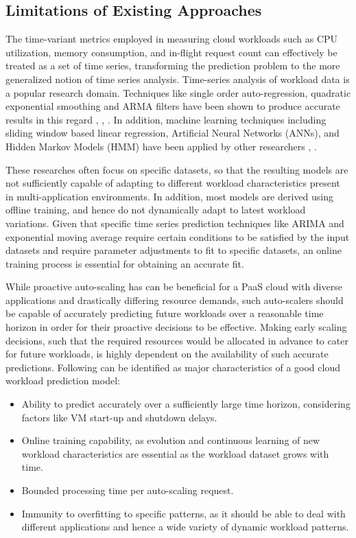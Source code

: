 \subsection{Limitations of Existing Approaches}

The time-variant metrics employed in measuring cloud workloads such as CPU utilization, memory consumption, and in-flight request count can effectively be treated as a set of time series, transforming the prediction problem to the more generalized notion of time series analysis. Time-series analysis of workload data is a popular research domain. Techniques like single order auto-regression, quadratic exponential smoothing and ARMA filters have been shown to produce accurate results in this regard \cite{Roy_2011}, \cite{Kupferman_2009}, \cite{Mi_2010}. In addition, machine learning techniques including sliding window based linear regression, Artificial Neural Networks (ANNs), and Hidden Markov Models (HMM) have been applied by other researchers \cite{Yang_2013}, \cite{Khan_2012}.

These researches often focus on specific datasets, so that the resulting models are not sufficiently capable of adapting to different workload characteristics present in multi-application environments. In addition, most models are derived using offline training, and hence do not dynamically adapt to latest workload variations. Given that specific time series prediction techniques like ARIMA and exponential moving average require certain conditions to be satisfied by the input datasets and require parameter adjustments to fit to specific datasets, an online training process is essential for obtaining an accurate fit.

While proactive auto-scaling has can be beneficial for a PaaS cloud with diverse applications and drastically differing resource demands, such auto-scalers should be capable of accurately predicting future workloads over a reasonable time horizon in order for their proactive decisions to be effective. Making early scaling decisions, such that the required resources would be allocated in advance to cater for future workloads, is highly dependent on the availability of such accurate predictions. Following can be identified as major characteristics of a good cloud workload prediction model:

\begin{itemize}
\item Ability to predict accurately over a sufficiently large time horizon, considering factors like VM start-up and shutdown delays.
\item Online training capability, as evolution and continuous learning of new workload characteristics are essential as the workload dataset grows with time.
\item Bounded processing time per auto-scaling request.
\item Immunity to overfitting to specific patterns, as it should be able to deal with different applications and hence a wide variety of dynamic workload patterns.
\end{itemize}
